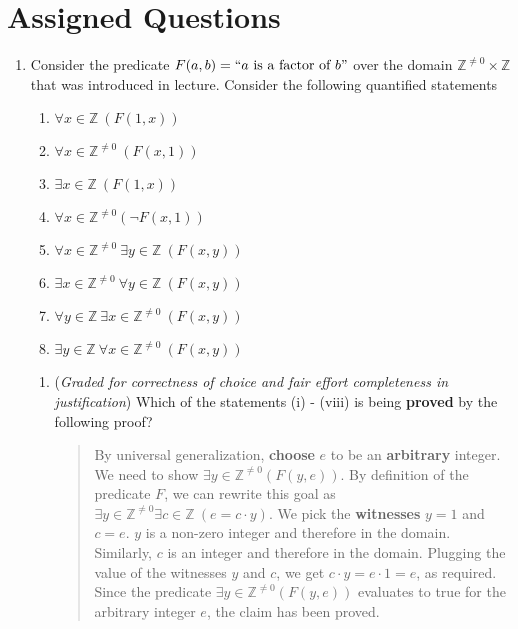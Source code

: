 \documentclass[12pt, oneside]{article}
\begin{document}
\newpage
\section*{Assigned Questions}
\begin{enumerate}



\item Consider the predicate  $F(a,b)  = ``a \text{ is a factor of } b"$ over  the domain $\mathbb{Z}^{\neq 0} \times \mathbb{Z}$ that was introduced in lecture. Consider the following quantified
statements
\label{factoring}

\begin{multicols}{2}
\begin{enumerate}[label=(\roman*)]
\item $\forall x \in \mathbb{Z} ~(F(1,x))$
\item $\forall x \in \mathbb{Z}^{\neq 0} ~(F(x,1))$
\item $\exists x \in \mathbb{Z} ~(F(1,x))$
\item $\forall x \in \mathbb{Z}^{\ne 0} ( \neg F(x,1))$
\item $\forall x \in \mathbb{Z}^{\neq 0} ~\exists y \in \mathbb{Z} ~(F(x,y))$
\item $\exists x \in \mathbb{Z}^{\neq 0} ~\forall y \in \mathbb{Z} ~(F(x,y))$
\item $\forall y \in \mathbb{Z} ~\exists x \in \mathbb{Z}^{\neq 0} ~(F(x,y))$
\item $\exists y \in \mathbb{Z} ~\forall x \in \mathbb{Z}^{\neq 0} ~(F(x,y))$
\end{enumerate}
\end{multicols}

\begin{enumerate}

\item ({\it Graded for correctness of choice and fair effort completeness in justification}) 
Which of the statements (i) - (viii) is being {\bf proved} by the following proof?

\begin{quote}
  By universal generalization, {\bf choose} $e$ to be an {\bf arbitrary} integer. 
  We need to show $\exists y \in \mathbb{Z}^{\neq 0} (F(y,e))$. By definition of the  predicate $F$, we can rewrite 
  this goal as $\exists y \in \mathbb{Z}^{\neq 0}  \exists c \in \mathbb{Z}~(e = c \cdot y)$. We pick the {\bf witnesses} $y = 1$  and $c = e$. $y$ is a non-zero integer and therefore in the domain. Similarly, $c$ is an integer and therefore in the domain. Plugging the value of the witnesses $y$ and $c$, we get 
  $c \cdot y = e \cdot 1 = e$, as required. Since the predicate $\exists y \in \mathbb{Z}^{\neq 0} (F(y,e))$ evaluates to true 
  for the arbitrary integer $e$, the claim has been proved.
  

\end{quote}
\end{enumerate}
\end{enumerate}
\end{document}

